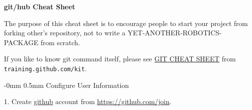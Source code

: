 \documentclass[10pt,landscape]{article}
\makeatletter
\renewcommand{\section}{\@startsection{section}{1}{0mm}%
                                {-0mm} %
                                {0.5mm}%
                                {\normalfont\large\bfseries}}
\makeatother
\begin{document}
\raggedright
\footnotesize
\begin{multicols}{2}


\setlength{\premulticols}{1pt}
\setlength{\postmulticols}{1pt}
\setlength{\multicolsep}{1pt}
\setlength{\columnsep}{2pt}

\begin{center}
     \Large{\textbf{git/hub Cheat Sheet}} \\
\end{center}
\newlength{\MyLen}


The purpose of this cheat sheet is to encourage people to start your
project from forking other's repository, not to write
a YET-ANOTHER-ROBOTICS-PACKAGE from scratch.

If you like to know git command itself, please see
\href{https://training.github.com/kit/downloads/github-git-cheat-sheet.pdf}{GIT
  CHEAT SHEET} from \texttt{training.github.com/kit}.

\vspace{2.5mm}
\section{Configure User Information}
\vspace{2.5mm}

1. Create \href{http://github.com}{github} account from
\href{https://github.com/join}{https://github.com/join}.


\end{multicols}
\end{document}
